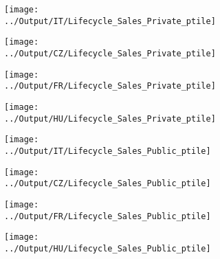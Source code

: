 \documentclass[12pt,notitlepage]{article}
\begin{document}
\begin{figure}[!htpb]
\centering
\caption{Sales (Percentile - Private)}
\begin{subfigure}{.49\textwidth}
    \centering
 \texttt{[image: ../Output/IT/Lifecycle\_Sales\_Private\_ptile]}
\end{subfigure}%
\begin{subfigure}{.49\textwidth}
    \centering
 \texttt{[image: ../Output/CZ/Lifecycle\_Sales\_Private\_ptile]}
\end{subfigure}
\begin{subfigure}{.49\textwidth}
    \centering
 \texttt{[image: ../Output/FR/Lifecycle\_Sales\_Private\_ptile]}
\end{subfigure}%
\begin{subfigure}{.49\textwidth}
    \centering
 \texttt{[image: ../Output/HU/Lifecycle\_Sales\_Private\_ptile]}
\end{subfigure}
\end{figure}
\pagebreak

\begin{figure}[!htpb]
\centering
\caption{Sales (Percentile - Public)}
\begin{subfigure}{.49\textwidth}
    \centering
 \texttt{[image: ../Output/IT/Lifecycle\_Sales\_Public\_ptile]}
\end{subfigure}%
\begin{subfigure}{.49\textwidth}
    \centering
 \texttt{[image: ../Output/CZ/Lifecycle\_Sales\_Public\_ptile]}
\end{subfigure}
\begin{subfigure}{.49\textwidth}
    \centering
 \texttt{[image: ../Output/FR/Lifecycle\_Sales\_Public\_ptile]}
\end{subfigure}%
\begin{subfigure}{.49\textwidth}
    \centering
 \texttt{[image: ../Output/HU/Lifecycle\_Sales\_Public\_ptile]}
\end{subfigure}
\end{figure}
\pagebreak
\end{document}
